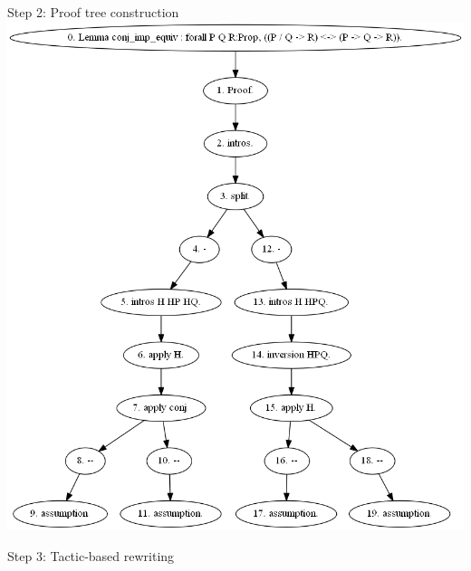 \documentclass[pdf]{beamer}
\begin{document}
\begin{frame}{Step 2: Proof tree construction}
    \vspace{-13pt}\center\includegraphics[height=0.85\textheight]{images/proof-tree.png}
\end{frame}

\begin{frame}{Step 3: Tactic-based rewriting}

\end{frame}
\end{document}
